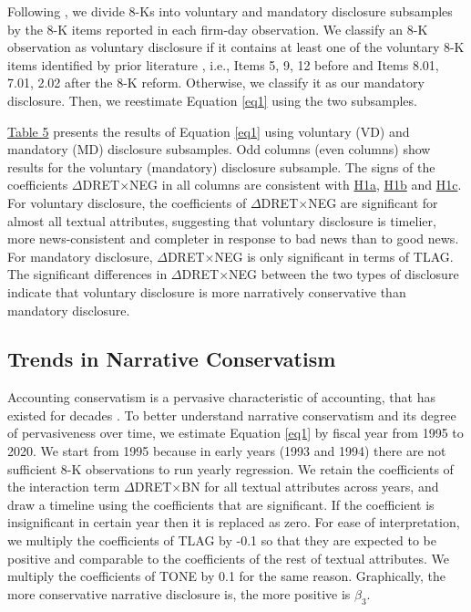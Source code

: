 \documentclass[letterpaper,12pt]{article}
\begin{document}
\begin{spacing}{1.5}
Following , we divide 8-Ks into voluntary and mandatory disclosure subsamples by the 8-K items reported in each firm-day observation. We classify an 8-K observation as voluntary disclosure if it contains at least one of the voluntary 8-K items identified by prior literature \cite{lermanNewForm8K2010, heMeasuringDisclosureUsing2020}, i.e., Items 5, 9, 12 before and Items 8.01, 7.01, 2.02 after the 8-K reform. Otherwise, we classify it as our mandatory disclosure. Then, we reestimate Equation \eqref{eq1} using the two subsamples. 

\hyperref[T5]{Table 5} presents the results of Equation \eqref{eq1} using voluntary (VD) and mandatory (MD) disclosure subsamples. Odd columns (even columns) show results for the voluntary (mandatory) disclosure subsample. The signs of the coefficients $\Delta$DRET$\times$NEG in all columns are consistent with \hyperref[hyp:h1a]{H1a}, \hyperref[hyp:h1b]{H1b} and \hyperref[hyp:h1c]{H1c}. For voluntary disclosure, the coefficients of $\Delta$DRET$\times$NEG are significant for almost all textual attributes, suggesting that voluntary disclosure is timelier, more news-consistent and completer in response to bad news than to good news. For mandatory disclosure, $\Delta$DRET$\times$NEG is only significant in terms of TLAG. The significant differences in $\Delta$DRET$\times$NEG between the two types of disclosure indicate that voluntary disclosure is more narratively conservative than mandatory disclosure.

\subsection{Trends in Narrative Conservatism}
\noindent Accounting conservatism is a pervasive characteristic of accounting, that has existed for decades \cite{sivakumarRailways2003}. To better understand narrative conservatism and its degree of pervasiveness over time, we estimate Equation \eqref{eq1} by fiscal year from 1995 to 2020. We start from 1995 because in early years (1993 and 1994) there are not sufficient 8-K observations to run yearly regression. We retain the coefficients of the interaction term $\Delta$DRET$\times$BN for all textual attributes across years, and draw a timeline using the coefficients that are significant. If the coefficient is insignificant in certain year then it is replaced as zero. For ease of interpretation, we multiply the coefficients of TLAG by -0.1 so that they are expected to be positive and comparable to the coefficients of the rest of textual attributes. We multiply the coefficients of TONE by 0.1 for the same reason. Graphically, the more conservative narrative disclosure is, the more positive is $\beta_3$.


\end{spacing}
\end{document}
